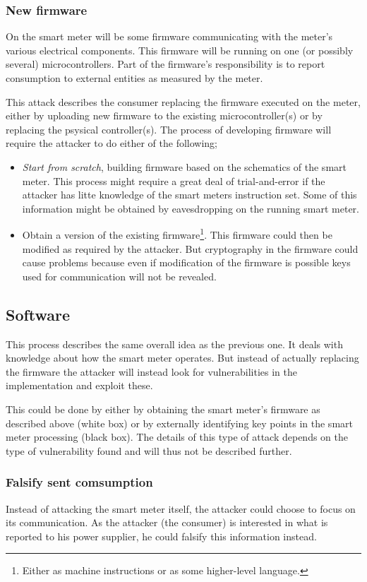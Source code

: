 \subsubsection{New firmware}
On the smart meter will be some firmware communicating with the meter's various electrical components.
This firmware will be running on one (or possibly several) microcontrollers.
Part of the firmware's responsibility is to report consumption to external entities as measured by the meter.

This attack describes the consumer replacing the firmware executed on the meter, either by uploading new firmware to the existing microcontroller(s) or by replacing the psysical controller(s).
The process of developing firmware will require the attacker to do either of the following;
\begin{itemize}
  \item \emph{Start from scratch}, building firmware based on the schematics of the smart meter.
  This process might require a great deal of trial-and-error if the attacker has litte knowledge of the smart meters instruction set.
  Some of this information might be obtained by eavesdropping on the running smart meter.
  \item Obtain a version of the existing firmware\footnote{Either as machine instructions or as some higher-level language.}.
    This firmware could then be modified as required by the attacker.
    But cryptography in the firmware could cause problems because even if modification of the firmware is possible keys used for communication will not be revealed.
\end{itemize}

\subsection{Software}
This process describes the same overall idea as the previous one.
It deals with knowledge about how the smart meter operates.
But instead of actually replacing the firmware the attacker will instead look for vulnerabilities in the implementation and exploit these.

This could be done by either by obtaining the smart meter's firmware as described above (white box) or by externally identifying key points in the smart meter processing (black box).
The details of this type of attack depends on the type of vulnerability found and will thus not be described further.

\subsubsection{Falsify sent comsumption}
Instead of attacking the smart meter itself, the attacker could choose to focus on its communication.
As the attacker (the consumer) is interested in what is reported to his power supplier, he could falsify this information instead.

